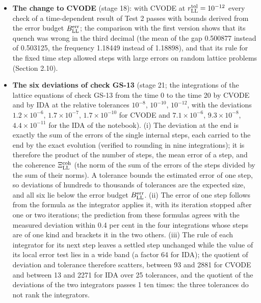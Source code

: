 \documentclass[
  10pt,
]{article}
\begin{document}
\begin{itemize}
  vector field \(V^{\rm F}_{{\rm LL},p}\) receive the rest masses
  \(M^{\rm W}_{\rm LL}\) and \(M^{\rm F}_{\rm LL}\); the surviving group
  is \(O(2)\), whose connected part \(U(1)^{\rm Q}_{\rm LL}\) is
  generated by the electric charge and is identified with the group of
  electromagnetism; its gauge field, the photon \(V^3_{{\rm LL},p}\), is
  the only massless gauge field.
\item
  \textbf{The change to CVODE} (stage 18): with CVODE at
  \(r^{\rm tol}_{\rm LL}=10^{-12}\) every check of a time-dependent
  result of Test 2 passes with bounds derived from the error budget
  \(B^{\rm err}_{\rm LL}\); the comparison with the first version shows
  that its quench was wrong in the third decimal (the mean of the gap
  0.500877 instead of 0.503125, the frequency 1.18449 instead of
  1.18898), and that its rule for the fixed time step allowed steps with
  large errors on random lattice problems (Section 2.10).
\item
  \textbf{The six deviations of check GS-13} (stage 21; the integrations
  of the lattice equations of check GS-13 from the time 0 to the time 20
  by CVODE and by IDA at the relative tolerances \(10^{-8}\),
  \(10^{-10}\), \(10^{-12}\), with the deviations \(1.2\times10^{-6}\),
  \(1.7\times10^{-7}\), \(1.7\times10^{-10}\) for CVODE and
  \(7.1\times10^{-6}\), \(9.3\times10^{-8}\), \(4.4\times10^{-11}\) for
  the IDA of the notebook). (i) The deviation at the end is exactly the
  sum of the errors of the single internal steps, each carried to the
  end by the exact evolution (verified to rounding in nine
  integrations); it is therefore the product of the number of steps, the
  mean error of a step, and the coherence \(\Xi^{\rm coh}_{\rm LL}\)
  (the norm of the sum of the errors of the steps divided by the sum of
  their norms). A tolerance bounds the estimated error of one step, so
  deviations of hundreds to thousands of tolerances are the expected
  size, and all six lie below the error budget \(B^{\rm err}_{\rm LL}\).
  (ii) The error of one step follows from the formula as the integrator
  applies it, with its iteration stopped after one or two iterations;
  the prediction from these formulas agrees with the measured deviation
  within 0.4 per cent in the four integrations whose steps are of one
  kind and brackets it in the two others. (iii) The rule of each
  integrator for its next step leaves a settled step unchanged while the
  value of its local error test lies in a wide band (a factor 64 for
  IDA); the quotient of deviation and tolerance therefore scatters,
  between 93 and 2881 for CVODE and between 13 and 2271 for IDA over 25
  tolerances, and the quotient of the deviations of the two integrators
  passes 1 ten times: the three tolerances do not rank the integrators.


\end{itemize}
\end{document}
